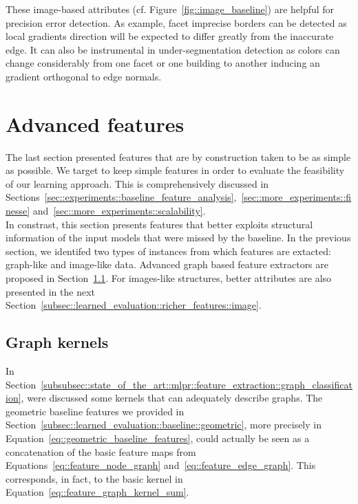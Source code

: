         These image-based attributes (cf. Figure~\ref{fig::image_baseline}) are helpful for precision error detection.
        As example, facet imprecise borders can be detected as local gradients direction will be expected to differ greatly from the inaccurate edge.
        It can also be instrumental in under-segmentation detection as colors can change considerably from one facet or one building to another inducing an gradient orthogonal to edge normals.

\section{Advanced features}
    \label{sec::learned_evaluation::richer_features}
    The last section presented features that are by construction taken to be as simple as possible.
    We target to keep simple features in order to evaluate the feasibility of our learning approach.
    This is comprehensively discussed in Sections~\ref{sec::experiments::baseline_feature_analysis},~\ref{sec::more_experiments::finesse} and~\ref{sec::more_experiments::scalability}.\\

    In constrast, this section presents features that better exploits structural information of the input models that were missed by the baseline.
    In the previous section, we identifed two types of instances from which features are extacted: graph-like and image-like data.
    Advanced graph based feature extractors are proposed in Section~\ref{subsec::learned_evaluation::richer_features::graph}.
    For images-like structures, better attributes are also presented in the next Section~\ref{subsec::learned_evaluation::richer_features::image}.

    \subsection{Graph kernels}
        \label{subsec::learned_evaluation::richer_features::graph}
        In Section~\ref{subsubsec::state_of_the_art::mlpr::feature_extraction::graph_classification}, were discussed some kernels that can adequately describe graphs.
        The geometric baseline features we provided in Section~\ref{subsec::learned_evaluation::baseline::geometric}, more precisely in Equation~\ref{eq::geometric_baseline_features}, could actually be seen as a concatenation of the basic feature maps from Equations~\ref{eq::feature_node_graph} and~\ref{eq::feature_edge_graph}.
        This corresponds, in fact, to the basic kernel in Equation~\ref{eq::feature_graph_kernel_sum}.\\

